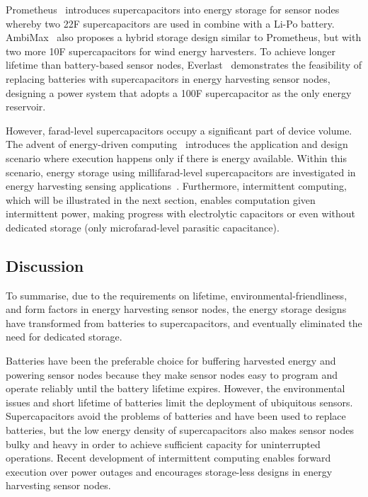 Prometheus~\cite{jiang2005perpetual} introduces supercapacitors into energy storage for sensor nodes whereby two 22F supercapacitors are used in combine with a Li-Po battery. AmbiMax~\cite{park2006ambimax} also proposes a hybrid storage design similar to Prometheus, but with two more 10F supercapacitors for wind energy harvesters. 
To achieve longer lifetime than battery-based sensor nodes, Everlast~\cite{simjee2006everlast} demonstrates the feasibility of replacing batteries with supercapacitors in energy harvesting sensor nodes, designing a power system that adopts a 100F supercapacitor as the only energy reservoir. 

However, farad-level supercapacitors occupy a significant part of device volume. The advent of energy-driven computing~\cite{merrett2017energy} introduces the application and design scenario where execution happens only if there is energy available. 
Within this scenario, energy storage using millifarad-level supercapacitors are investigated in energy harvesting sensing applications~\cite{naderiparizi2015wispcam, gomez2016dynamic}. 
Furthermore, intermittent computing, which will be illustrated in the next section, enables computation given intermittent power, making progress with electrolytic capacitors or even without dedicated storage (only microfarad-level parasitic capacitance).

\subsection{Discussion}

To summarise, due to the requirements on lifetime, environmental-friendliness, and form factors in energy harvesting sensor nodes, the energy storage designs have transformed from batteries to supercapacitors, and eventually eliminated the need for dedicated storage. 

Batteries have been the preferable choice for buffering harvested energy and powering sensor nodes because they make sensor nodes easy to program and operate reliably until the battery lifetime expires. 
However, the environmental issues and short lifetime of batteries limit the deployment of ubiquitous sensors. 
Supercapacitors avoid the problems of batteries and have been used to replace batteries, but the low energy density of supercapacitors also makes sensor nodes bulky and heavy in order to achieve sufficient capacity for uninterrupted operations. 
Recent development of intermittent computing enables forward execution over power outages and encourages storage-less designs in energy harvesting sensor nodes.

